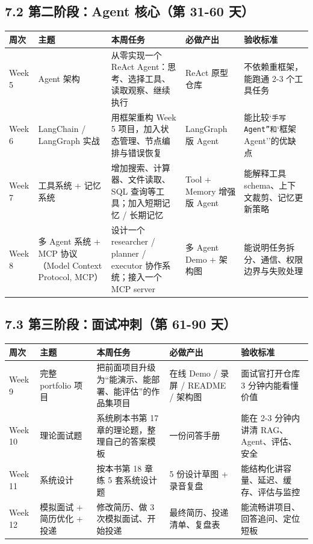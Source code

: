 \subsection{7.2 第二阶段：Agent 核心（第 31-60 天）}

\begingroup
\scriptsize
\setlength{\tabcolsep}{3pt}
\begin{longtable}{|p{}|p{}|p{}|p{}|p{}|}
\hline
周次 & 主题 & 本周任务 & 必做产出 & 验收标准 \\ \hline
Week 5 & Agent 架构 & 从零实现一个 ReAct Agent：思考、选择工具、读取观察、继续执行 & ReAct 原型仓库 & 不依赖重框架，能跑通 2-3 个工具任务 \\ \hline
Week 6 & LangChain / LangGraph 实战 & 用框架重构 Week 5 项目，加入状态管理、节点编排与错误恢复 & LangGraph 版 Agent & 能比较`\texttt{手写 Agent''和}`框架 Agent''的优缺点 \\ \hline
Week 7 & 工具系统 + 记忆系统 & 增加搜索、计算器、文件读取、SQL 查询等工具；加入短期记忆 / 长期记忆 & Tool + Memory 增强版 Agent & 能解释工具 schema、上下文裁剪、记忆更新策略 \\ \hline
Week 8 & 多 Agent 系统 + MCP 协议（Model Context Protocol, MCP） & 设计一个 researcher / planner / executor 协作系统；接入一个 MCP server & 多 Agent Demo + 架构图 & 能说明任务拆分、通信、权限边界与失败处理 \\ \hline
\end{longtable}
\endgroup

\subsection{7.3 第三阶段：面试冲刺（第 61-90 天）}

\begingroup
\scriptsize
\setlength{\tabcolsep}{3pt}
\begin{longtable}{|p{}|p{}|p{}|p{}|p{}|}
\hline
周次 & 主题 & 本周任务 & 必做产出 & 验收标准 \\ \hline
Week 9 & 完整 portfolio 项目 & 把前面项目升级为``能演示、能部署、能评估''的作品集项目 & 在线 Demo / 录屏 / README / 架构图 & 面试官打开仓库 3 分钟内能看懂价值 \\ \hline
Week 10 & 理论面试题 & 系统刷本书第 17 章的理论题，整理自己的答案模板 & 一份问答手册 & 能在 2-3 分钟内讲清 RAG、Agent、评估、安全 \\ \hline
Week 11 & 系统设计 & 按本书第 18 章练 5 套系统设计题 & 5 份设计草图 + 录音复盘 & 能结构化讲容量、延迟、缓存、评估与监控 \\ \hline
Week 12 & 模拟面试 + 简历优化 + 投递 & 修改简历、做 3 次模拟面试、开始投递 & 最终简历、投递清单、复盘表 & 能流畅讲项目、回答追问、定位短板 \\ \hline
\end{longtable}
\endgroup

